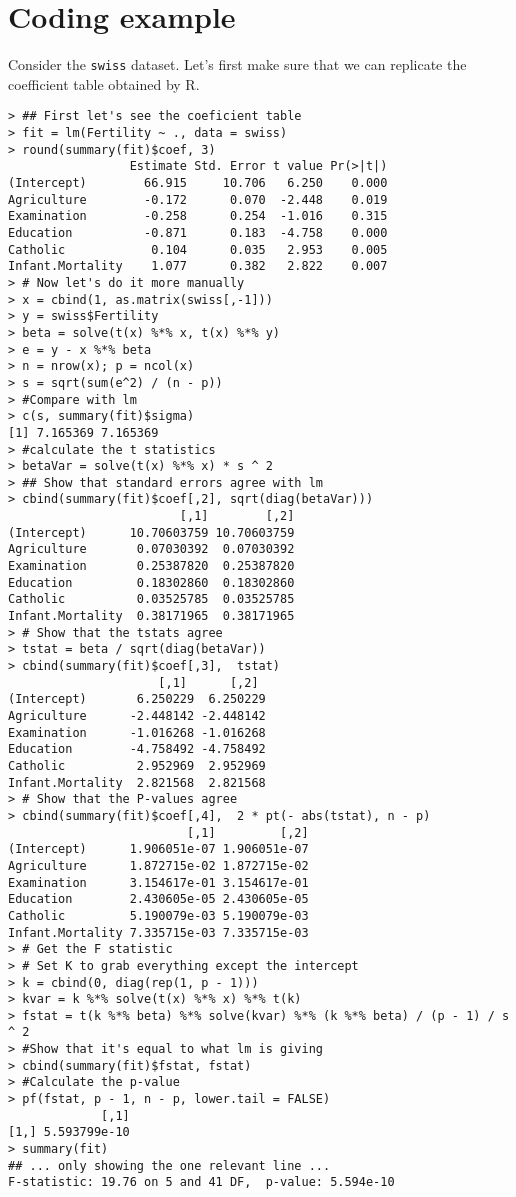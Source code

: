 \section{Coding example}
Consider the \texttt{swiss} dataset. Let's first make sure that we can replicate
the coefficient table obtained by R.
\begin{verbatim}
> ## First let's see the coeficient table
> fit = lm(Fertility ~ ., data = swiss)
> round(summary(fit)$coef, 3)
                 Estimate Std. Error t value Pr(>|t|)
(Intercept)        66.915     10.706   6.250    0.000
Agriculture        -0.172      0.070  -2.448    0.019
Examination        -0.258      0.254  -1.016    0.315
Education          -0.871      0.183  -4.758    0.000
Catholic            0.104      0.035   2.953    0.005
Infant.Mortality    1.077      0.382   2.822    0.007
> # Now let's do it more manually
> x = cbind(1, as.matrix(swiss[,-1]))
> y = swiss$Fertility
> beta = solve(t(x) %*% x, t(x) %*% y)
> e = y - x %*% beta
> n = nrow(x); p = ncol(x)
> s = sqrt(sum(e^2) / (n - p))
> #Compare with lm
> c(s, summary(fit)$sigma)
[1] 7.165369 7.165369
> #calculate the t statistics
> betaVar = solve(t(x) %*% x) * s ^ 2 
> ## Show that standard errors agree with lm
> cbind(summary(fit)$coef[,2], sqrt(diag(betaVar)))
                        [,1]        [,2]
(Intercept)      10.70603759 10.70603759
Agriculture       0.07030392  0.07030392
Examination       0.25387820  0.25387820
Education         0.18302860  0.18302860
Catholic          0.03525785  0.03525785
Infant.Mortality  0.38171965  0.38171965
> # Show that the tstats agree
> tstat = beta / sqrt(diag(betaVar))
> cbind(summary(fit)$coef[,3],  tstat)
                     [,1]      [,2]
(Intercept)       6.250229  6.250229
Agriculture      -2.448142 -2.448142
Examination      -1.016268 -1.016268
Education        -4.758492 -4.758492
Catholic          2.952969  2.952969
Infant.Mortality  2.821568  2.821568
> # Show that the P-values agree
> cbind(summary(fit)$coef[,4],  2 * pt(- abs(tstat), n - p)
                         [,1]         [,2]
(Intercept)      1.906051e-07 1.906051e-07
Agriculture      1.872715e-02 1.872715e-02
Examination      3.154617e-01 3.154617e-01
Education        2.430605e-05 2.430605e-05
Catholic         5.190079e-03 5.190079e-03
Infant.Mortality 7.335715e-03 7.335715e-03
> # Get the F statistic
> # Set K to grab everything except the intercept
> k = cbind(0, diag(rep(1, p - 1)))
> kvar = k %*% solve(t(x) %*% x) %*% t(k)
> fstat = t(k %*% beta) %*% solve(kvar) %*% (k %*% beta) / (p - 1) / s ^ 2
> #Show that it's equal to what lm is giving
> cbind(summary(fit)$fstat, fstat)
> #Calculate the p-value
> pf(fstat, p - 1, n - p, lower.tail = FALSE)
             [,1]
[1,] 5.593799e-10
> summary(fit)
## ... only showing the one relevant line ...
F-statistic: 19.76 on 5 and 41 DF,  p-value: 5.594e-10
\end{verbatim}



